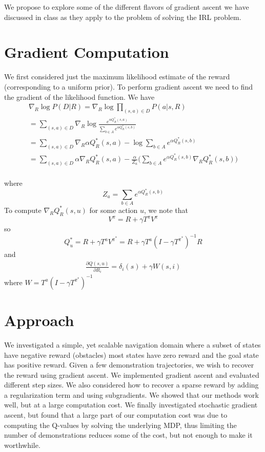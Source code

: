 \documentclass[10pt,a4paper]{article}
\begin{document}
We propose to explore some of the different flavors of gradient ascent we have discussed in class as they apply to the problem of solving the IRL problem.

\section{Gradient Computation}
We first considered just the maximum likelihood estimate of the reward (corresponding to a uniform prior). To perform gradient ascent we need to find the gradient of the likelihood function. We have 
\begin{eqnarray}
\nabla_R \log P(D | R) = \nabla_R \log \prod_{(s,a) \in D} P(a | s, R) \\
=\sum_{(s,a) \in D} \nabla_R \log \frac{e^{\alpha Q_R^*(s,a)}}{\sum_{b \in A} e^{\alpha Q_R^*(s,b)}}\\
= \sum_{(s,a) \in D} \nabla_R \alpha Q_R^*(s,a) - \log \sum_{b \in A} e^{\alpha Q_R^*(s,b)}\\
= \sum_{(s,a) \in D} \alpha \nabla_R Q_R^*(s,a) - \frac{\alpha}{Z_a}\bigg(\sum_{b \in A} e^{\alpha Q_R^*(s,b)} \nabla_R Q_R^*(s,b)\bigg)\\
\end{eqnarray}

where 
\begin{equation}
Z_a = \sum_{b \in A} e^{\alpha Q_R^*(s,b)}
\end{equation}
To compute $\nabla_R Q^*_R(s,u)$ for some action $u$, we note that 
\begin{equation}
V^{\pi} = R + \gamma T^{\pi} V^{\pi}
\end{equation}
so 
\begin{equation}
Q^*_u = R + \gamma T^a V^{\pi^*} = R + \gamma T^a(I - \gamma T^{\pi^*})^{-1}R
\end{equation}
and
\begin{eqnarray}
\frac{\partial Q(s,u)}{\partial R_i} = \delta_i(s) + \gamma W(s,i)
\end{eqnarray}
where $W = T^a(I - \gamma T^{\pi^*})^{-1}$

\section{Approach}
We investigated a simple, yet scalable navigation domain where a subset of states have negative reward (obstacles) most states have zero reward and the goal state has positive reward. Given a few demonstration trajectories, we wish to recover the reward using gradient ascent. We implemented gradient ascent and evaluated different step sizes. We also considered how to recover a sparse reward by adding a regularization term and using subgradients. We showed that our methods work well, but at a large computation cost. We finally investigated stochastic gradient ascent, but found that a large part of our computation cost was due to computing the Q-values by solving the underlying MDP, thus limiting the number of demonstrations reduces some of the cost, but not enough to make it worthwhile. 
\end{document}
